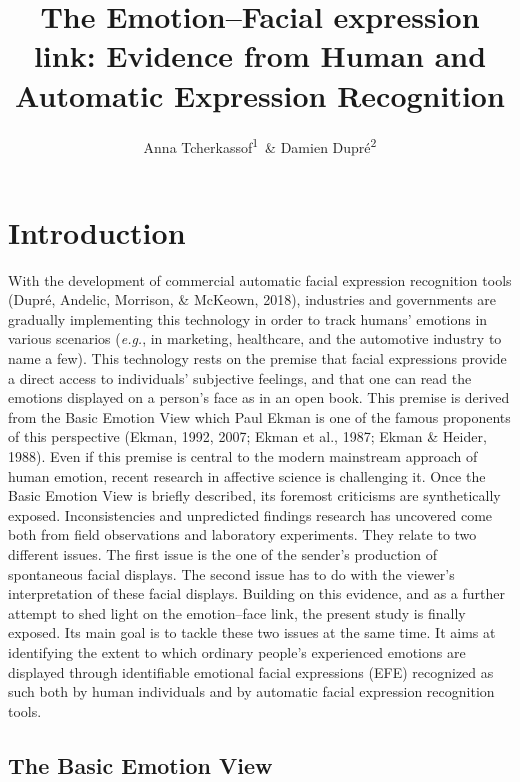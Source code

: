 \documentclass[man]{apa6}
\title{The Emotion--Facial expression link: Evidence from Human and Automatic Expression Recognition}
\author{Anna Tcherkassof\textsuperscript{1}~\& Damien Dupré\textsuperscript{2}}
\date{}
\affiliation{
\vspace{0.5cm}
\textsuperscript{1} University Grenoble Alpes, Grenoble, France\\\textsuperscript{2} Dublin City University, Dublin, Ireland}
\begin{document}
\maketitle

{
\setcounter{tocdepth}{2}
\tableofcontents
}
\hypertarget{introduction}{%
\section{Introduction}\label{introduction}}

With the development of commercial automatic facial expression recognition tools (Dupré, Andelic, Morrison, \& McKeown, 2018), industries and governments are gradually implementing this technology in order to track humans' emotions in various scenarios (\emph{e.g.}, in marketing, healthcare, and the automotive industry to name a few). This technology rests on the premise that facial expressions provide a direct access to individuals' subjective feelings, and that one can read the emotions displayed on a person's face as in an open book. This premise is derived from the Basic Emotion View which Paul Ekman is one of the famous proponents of this perspective (Ekman, 1992, 2007; Ekman et al., 1987; Ekman \& Heider, 1988). Even if this premise is central to the modern mainstream approach of human emotion, recent research in affective science is challenging it. Once the Basic Emotion View is briefly described, its foremost criticisms are synthetically exposed. Inconsistencies and unpredicted findings research has uncovered come both from field observations and laboratory experiments. They relate to two different issues. The first issue is the one of the sender's production of spontaneous facial displays. The second issue has to do with the viewer's interpretation of these facial displays. Building on this evidence, and as a further attempt to shed light on the emotion--face link, the present study is finally exposed. Its main goal is to tackle these two issues at the same time. It aims at identifying the extent to which ordinary people's experienced emotions are displayed through identifiable emotional facial expressions (EFE) recognized as such both by human individuals and by automatic facial expression recognition tools.

\hypertarget{the-basic-emotion-view}{%
\subsection{The Basic Emotion View}\label{the-basic-emotion-view}}
\end{document}
